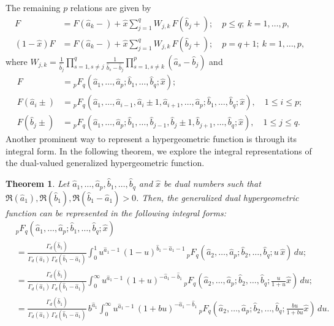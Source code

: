 \documentclass[11pt,a4paper,fleqn]{article}
\newtheorem{theorem}{Theorem}
\numberwithin{equation}{section}
\numberwithin{lemma}{section}
\numberwithin{theorem}{section}
\numberwithin{corollary}{section}
\begin{document}
The remaining $p$ relations are given by 
\begin{align}
	F &= F(\widehat{a}_k-) + \widehat{x} \sum_{j=1}^{q} W_{j,k} \, F(\widehat{b}_j+); \quad p\leq q; \ k = 1,  \dots, p,
	\label{eq6.8} \\
	(1-\widehat{x})F & = F(\widehat{a}_k-) + \widehat{x} \sum_{j=1}^{q} W_{j,k} \, F(\widehat{b}_j+); \quad p = q +1; \ k = 1,  \dots, p, \label{eq6.9}
\end{align}
where $W_{j,k} = \frac{1}{\widehat{b}_j} \displaystyle
\prod_{s=1, s\ne j}^{q} \frac{1}{\widehat{b}_s-\widehat{b}_j}  \prod_{s=1, s\ne k }^{p}(\widehat{a}_s-\widehat{b}_j)$ and 
\begin{align*}
F & = 	{}_pF_q (\widehat{a}_1, \dots, \widehat{a}_p; \widehat{b}_1, \dots, \widehat{b}_q;  \widehat{x});
\\[5pt]
F(\widehat{a}_i \pm) & = {}_pF_q (\widehat{a}_1, \dots, \widehat{a}_{i - 1}, \widehat{a}_i \pm 1, \widehat{a}_{i + 1}, \dots, \widehat{a}_p; \widehat{b}_1, \dots, \widehat{b}_q;  \widehat{x}), \quad 1 \le i \le p;
\\[5pt]
F(\widehat{b}_j \pm) & = {}_pF_q (\widehat{a}_1, \dots, \widehat{a}_p; \widehat{b}_1, \dots, \widehat{b}_{j - 1}, \widehat{b}_j \pm 1, \widehat{b}_{j + 1}, \dots, \widehat{b}_q;  \widehat{x}), \quad 1 \le j \le q.
\end{align*}
Another prominent way to represent a hypergeometric function is through its integral form. In the following theorem, we explore the integral representations of the dual-valued generalized hypergeometric function. 
\begin{theorem}\label{t4.1}
Let $\widehat{a}_1, \dots, \widehat{a}_p, \widehat{b}_1, \dots, \widehat{b}_q$ and $\widehat{x}$ be dual numbers such that $\Re(\widehat{a}_1), \Re(\widehat{b}_1), \Re(\widehat{b}_1 - \widehat{a}_1) > 0$. Then, the generalized dual hypergeometric function can be represented in the following integral forms:
\begin{align}
& {}_pF_q (\widehat{a}_1, \dots, \widehat{a}_p; \widehat{b}_1, \dots, \widehat{b}_q;  \widehat{x})\nonumber\\
& = \frac{\Gamma_d(\widehat{b}_1)}{\Gamma_d(\widehat{a}_1) \, \Gamma_d(\widehat{b}_1 - \widehat{a}_1)} \int_{0}^{1} u^{\widehat{a}_1 - 1} \, (1 - u)^{\widehat{b}_1 - \widehat{a}_1 - 1} \, {}_pF_q (\widehat{a}_2, \dots, \widehat{a}_p; \widehat{b}_2, \dots, \widehat{b}_q; u \,  \widehat{x}) \, d u;\label{4.16}
\\[5pt]
& = \frac{\Gamma_d(\widehat{b}_1)}{\Gamma_d(\widehat{a}_1) \, \Gamma_d(\widehat{b}_1 - \widehat{a}_1)} \int_{0}^{\infty} u^{\widehat{a}_1 - 1} \, (1 + u)^{-\widehat{a}_1 - \widehat{b}_1 } \, {}_pF_q \left(\widehat{a}_2, \dots, \widehat{a}_p; \widehat{b}_2, \dots, \widehat{b}_q;   \frac{u}{1 + u}\widehat{x}\right) \, d u;\label{4.17}
\\[5pt]
& = \frac{\Gamma_d(\widehat{b}_1)}{\Gamma_d(\widehat{a}_1) \, \Gamma_d(\widehat{b}_1 - \widehat{a}_1)} \, b^{\widehat{a}_1} \int_{0}^{\infty} u^{\widehat{a}_1 - 1} \, (1 + bu)^{-\widehat{a}_1 - \widehat{b}_1 } \, {}_pF_q \left(\widehat{a}_2, \dots, \widehat{a}_p; \widehat{b}_2, \dots, \widehat{b}_q;   \frac{bu}{1 + bu}\widehat{x}\right) \, d u.\label{4.18}
\end{align}
\end{theorem} 
\end{document}
